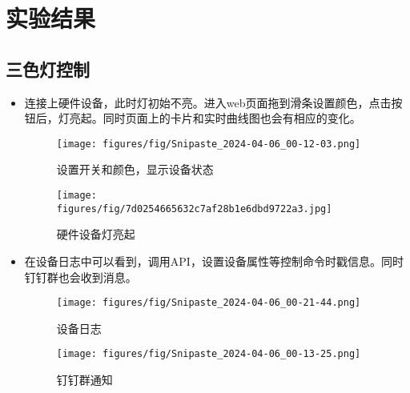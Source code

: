 \documentclass[12pt,hyperref,a4paper,UTF8]{ctexart}
\begin{document}
\begin{itemize}
\end{itemize}


\section{实验结果}
\subsection*{三色灯控制}
\begin{itemize}
  \item 连接上硬件设备，此时灯初始不亮。进入web页面拖到滑条设置颜色，点击按钮后，灯亮起。同时页面上的卡片和实时曲线图也会有相应的变化。
  \begin{figure}[H]
    \centering
    \texttt{[image: figures/fig/Snipaste\_2024-04-06\_00-12-03.png]}
    \caption{设置开关和颜色，显示设备状态}
    \label{fig:enter-label}
  \end{figure}
  \begin{figure}[H]
    \centering
    \texttt{[image: figures/fig/7d0254665632c7af28b1e6dbd9722a3.jpg]}
    \caption{硬件设备灯亮起}
    \label{fig:enter-label}
  \end{figure}
  \item 在设备日志中可以看到，调用API，设置设备属性等控制命令时戳信息。同时钉钉群也会收到消息。
  \begin{figure}[H]
    \centering
    \texttt{[image: figures/fig/Snipaste\_2024-04-06\_00-21-44.png]}
    \caption{设备日志}
    \label{fig:enter-label}
  \end{figure}
  \begin{figure}[H]
    \centering
    \texttt{[image: figures/fig/Snipaste\_2024-04-06\_00-13-25.png]}
    \caption{钉钉群通知}
    \label{fig:enter-label}
  \end{figure}
\end{itemize}





\end{document}
